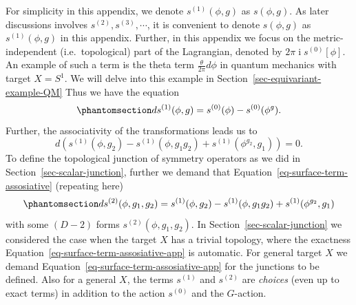 \documentclass[
  letterpaper,
  DIV=11,
  numbers=noendperiod]{scrreport}
\DeclareMathOperator{\imunit}{i}
\begin{document}
For simplicity in this appendix, we denote \(s^{(1)}(\phi,g)\) as
\(s(\phi,g)\). As later discussions involves
\(s^{(2)}, s^{(3)},\cdots\), it is convenient to denote \(s(\phi, g)\)
as \(s^{(1)}(\phi,g)\) in this appendix. Further, in this appendix we
focus on the metric-independent (i.e.~topological) part of the
Lagrangian, denoted by \(2\pi\imunit s^{(0)}[\phi]\). An example of such
a term is the theta term \(\frac{\theta}{2\pi} d\phi\) in quantum
mechanics with target \(X=S^1\). We will delve into this example in
Section~\ref{sec-equivariant-example-QM} Thus we have the equation
\begin{equation}\phantomsection\label{eq-surface-term-def}{
ds^{(1)}(\phi,g) = s^{(0)}(\phi) - s^{(0)}(\phi^g).
}\end{equation} Further, the associativity of the transformations leads
us to \[
d(s^{(1)}(\phi,g_2) - s^{(1)}(\phi,g_1g_2) + s^{(1)}(\phi^{g_2},g_1))= 0.
\] To define the topological junction of symmetry operators as we did in
Section~\ref{sec-scalar-junction}, further we demand that
Equation~\ref{eq-surface-term-assosiative} (repeating here)
\begin{equation}\phantomsection\label{eq-surface-term-assosiative-app}{ 
ds^{(2)}(\phi,g_1,g_2) = s^{(1)}(\phi,g_2) - s^{(1)}(\phi,g_1g_2) + s^{(1)}(\phi^{g_2},g_1)
}\end{equation} with some \((D-2)\) forms \(s^{(2)}(\phi,g_1,g_2)\). In
Section~\ref{sec-scalar-junction} we considered the case when the target
\(X\) has a trivial topology, where the exactness
Equation~\ref{eq-surface-term-assosiative-app} is automatic. For general
target \(X\) we demand Equation~\ref{eq-surface-term-assosiative-app}
for the junctions to be defined. Also for a general \(X\), the terms
\(s^{(1)}\) and \(s^{(2)}\) are \emph{choices} (even up to exact terms)
in addition to the action \(s^{(0)}\) and the \(G\)-action.
\end{document}
